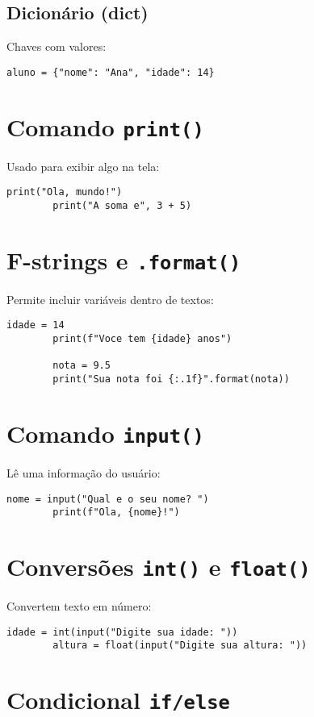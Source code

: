 \documentclass[12pt]{article}
\begin{document}
	\subsection*{Dicionário (dict)}
	Chaves com valores:
	\begin{lstlisting}[style=pythonstyle]
		aluno = {"nome": "Ana", "idade": 14}
	\end{lstlisting}
	
	\section{Comando \texttt{print()}}
	Usado para exibir algo na tela:
	
	\begin{lstlisting}[style=pythonstyle]
		print("Ola, mundo!")
		print("A soma e", 3 + 5)
	\end{lstlisting}
	
	\section{F-strings e \texttt{.format()}}
	Permite incluir variáveis dentro de textos:
	
	\begin{lstlisting}[style=pythonstyle]
		idade = 14
		print(f"Voce tem {idade} anos")
		
		nota = 9.5
		print("Sua nota foi {:.1f}".format(nota))
	\end{lstlisting}
	
	\section{Comando \texttt{input()}}
	Lê uma informação do usuário:
	\begin{lstlisting}[style=pythonstyle]
		nome = input("Qual e o seu nome? ")
		print(f"Ola, {nome}!")
	\end{lstlisting}
	
	\section{Conversões \texttt{int()} e \texttt{float()}}
	Convertem texto em número:
	\begin{lstlisting}[style=pythonstyle]
		idade = int(input("Digite sua idade: "))
		altura = float(input("Digite sua altura: "))
	\end{lstlisting}
	
	\section{Condicional \texttt{if/else}}
	
\end{document}
